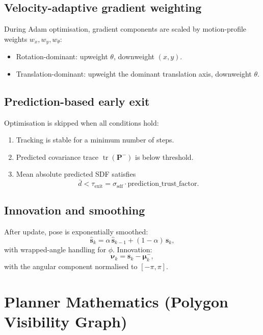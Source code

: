 \documentclass[a4paper, 11pt]{article}
\DeclareMathOperator{\trace}{tr}
\newcommand{\vect}[1]{\bm{#1}}
\newcommand{\mat}[1]{\bm{#1}}
\begin{document}
\subsection{Velocity-adaptive gradient weighting}

During Adam optimisation, gradient components are scaled by
motion-profile weights $w_x, w_y, w_\theta$:
\begin{itemize}
  \item Rotation-dominant: upweight $\theta$, downweight $(x, y)$.
  \item Translation-dominant: upweight the dominant translation axis,
        downweight $\theta$.
\end{itemize}

\subsection{Prediction-based early exit}

Optimisation is skipped when all conditions hold:
\begin{enumerate}
  \item Tracking is stable for a minimum number of steps.
  \item Predicted covariance trace $\trace(\mat{P}^{-})$ is below threshold.
  \item Mean absolute predicted SDF satisfies
    \begin{equation}
      \bar{d} < \tau_{\text{exit}}
      = \sigma_{\text{sdf}} \cdot \text{prediction\_trust\_factor}.
    \end{equation}
\end{enumerate}

\subsection{Innovation and smoothing}

After update, pose is exponentially smoothed:
\begin{equation}
  \hat{\vect{s}}_k
  = \alpha\,\hat{\vect{s}}_{k-1} + (1-\alpha)\,\vect{s}_k,
\end{equation}
with wrapped-angle handling for $\phi$.  Innovation:
\begin{equation}
  \vect{\nu}_k = \vect{s}_k - \vect{\mu}_k^{-},
\end{equation}
with the angular component normalised to $[-\pi, \pi]$.

\section{Planner Mathematics (Polygon Visibility Graph)}\label{sec:planner}
\end{document}
